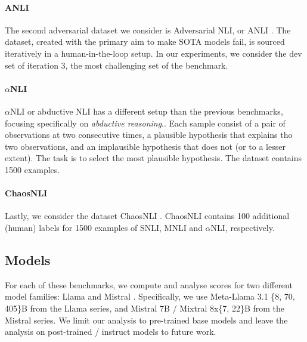 \vspace{-1mm}
\paragraph{ANLI}
The second adversarial dataset we consider is Adversarial NLI, or ANLI \citep{nie-etal-2020-adversarial}.
The dataset, created with the primary aim to make SOTA models fail, is sourced iteratively in a human-in-the-loop setup.
In our experiments, we consider the dev set of iteration 3, the most challenging set of the benchmark.

\vspace{-1mm}
\paragraph{$\alpha$NLI}
$\alpha$NLI or abductive NLI \citep{bhagavatula2020abductive} has a different setup than the previous benchmarks, focusing specifically on \emph{abductive reasoning}..
Each sample consist of a pair of observations at two consecutive times, a plausible hypothesis that explains tho two observations, and an implausible hypothesis that does not (or to a lesser extent).
The task is to select the most plausible hypothesis.
The dataset contains 1500 examples.

\vspace{-1mm}
\paragraph{ChaosNLI}
Lastly, we consider the dataset ChaosNLI \citep{nie-etal-2020-learn}.
ChaosNLI contains 100 additional (human) labels for 1500 examples of SNLI, MNLI and $\alpha$NLI, respectively.

\subsection{Models} For each of these benchmarks, we compute and analyse scores for two different model families: Llama \citep{dubey2024llama} and Mistral \citep{jiang2023mistral, jiang2024mixtral}. 
Specifically, we use Meta-Llama 3.1 \{8, 70, 405\}B from the Llama series, and Mistral 7B / Mixtral 8x\{7, 22\}B from the Mistral series.
We limit our analysis to pre-trained base models and leave the analysis on post-trained / instruct models to future work.

